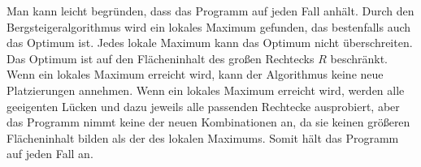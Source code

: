 Man kann leicht begründen, dass das Programm auf jeden Fall anhält.
Durch den Bergsteigeralgorithmus wird ein lokales Maximum gefunden, das bestenfalls auch
das Optimum ist. 
Jedes lokale Maximum kann das Optimum nicht überschreiten.
Das Optimum ist auf den Flächeninhalt des großen Rechtecks $R$ beschränkt.
Wenn ein lokales Maximum erreicht wird, kann der Algorithmus keine neue Platzierungen
annehmen. 
Wenn ein lokales Maximum erreicht wird, werden alle geeigenten Lücken und dazu jeweils alle 
passenden Rechtecke ausprobiert, aber das Programm nimmt keine der neuen Kombinationen an,
da sie keinen größeren Flächeninhalt bilden als der des lokalen Maximums.
Somit hält das Programm auf jeden Fall an.
 












